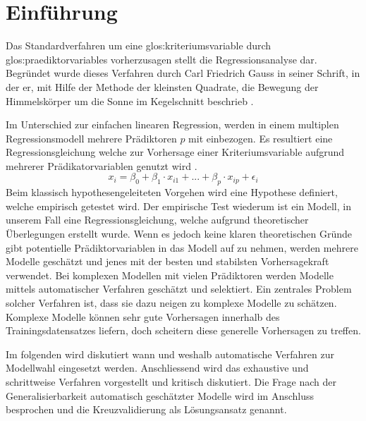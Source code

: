 \section{Einführung}
Das Standardverfahren um eine \Gls{glos:kriteriumsvariable} durch \Glspl{glos:praediktorvariable} vorherzusagen stellt die Regressionsanalyse dar.
Begründet wurde dieses Verfahren durch Carl Friedrich Gauss in seiner Schrift, in der er, mit Hilfe der Methode der kleinsten Quadrate, die Bewegung der Himmelskörper um die Sonne im Kegelschnitt beschrieb \cite{gauss1809theoria}. 

Im Unterschied zur einfachen linearen Regression, werden in einem multiplen Regressionsmodell mehrere Prädiktoren $p$ mit einbezogen. 
Es resultiert eine Regressionsgleichung welche zur Vorhersage einer Kriteriumsvariable aufgrund mehrerer Prädikatorvariablen genutzt wird  \cite[S. 448]{bortz2011}. 
\begin{equation}
x_i = \beta_0 + \beta_1\cdot x_{i1} + ... +  \beta_p\cdot x_{ip} + \epsilon_i
\tag{multiple lineare Regression}
\end{equation}
Beim klassisch hypothesengeleiteten Vorgehen wird eine Hypothese definiert, welche empirisch getestet wird.
Der empirische Test wiederum ist ein Modell, in unserem Fall eine Regressionsgleichung, welche aufgrund theoretischer Überlegungen erstellt wurde.
Wenn es jedoch keine klaren theoretischen Gründe gibt potentielle Prädiktorvariablen in das Modell auf zu nehmen, werden mehrere Modelle geschätzt und jenes mit der besten und stabilsten Vorhersagekraft verwendet.
Bei komplexen Modellen mit vielen Prädiktoren werden Modelle mittels automatischer Verfahren geschätzt und selektiert.
Ein zentrales Problem solcher Verfahren ist, dass sie dazu neigen zu komplexe Modelle zu schätzen. 
Komplexe Modelle können sehr gute Vorhersagen innerhalb des Trainingsdatensatzes liefern, doch scheitern diese generelle Vorhersagen zu treffen.

Im folgenden wird diskutiert wann und weshalb automatische Verfahren zur Modellwahl eingesetzt werden. 
Anschliessend wird das exhaustive und schrittweise Verfahren vorgestellt und kritisch diskutiert.
Die Frage nach der Generalisierbarkeit automatisch geschätzter Modelle wird im Anschluss besprochen und die Kreuzvalidierung als Lösungsansatz genannt.